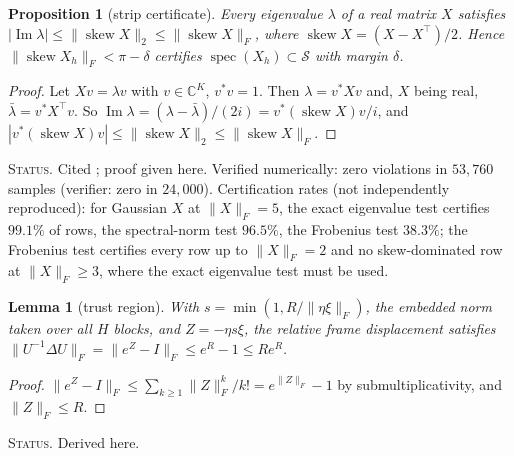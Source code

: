 \documentclass[11pt]{article}
\newtheorem{proposition}[theorem]{Proposition}
\newtheorem{lemma}[theorem]{Lemma}
\theoremstyle{definition}
\theoremstyle{remark}
\newcommand{\C}{\mathbb{C}}
\newcommand{\Imag}{\operatorname{Im}}
\newcommand{\spec}{\operatorname{spec}}
\newcommand{\status}[1]{\par\smallskip\noindent\textsc{Status.} #1\par\smallskip}
\begin{document}
\begin{proposition}[strip certificate]\label{prop:bendixson}
Every eigenvalue $\lambda$ of a real matrix $X$ satisfies $|\Imag \lambda|\le\|\operatorname{skew}X\|_2\le\|\operatorname{skew}X\|_F$, where $\operatorname{skew}X=(X-X^\top)/2$. Hence $\|\operatorname{skew}X_h\|_F<\pi-\delta$ certifies $\spec(X_h)\subset\mathcal{S}$ with margin $\delta$.
\end{proposition}
\begin{proof}
Let $Xv=\lambda v$ with $v\in\C^K$, $v^*v=1$. Then $\lambda=v^*Xv$ and, $X$ being real, $\bar\lambda=v^*X^\top v$. So $\Imag \lambda=(\lambda-\bar\lambda)/(2i)=v^*(\operatorname{skew}X)v/i$, and $|v^*(\operatorname{skew}X)v|\le\|\operatorname{skew}X\|_2\le\|\operatorname{skew}X\|_F$.
\end{proof}
\status{Cited \cite{Bendixson1902}; proof given here. Verified numerically: zero violations in $53{,}760$ samples (verifier: zero in $24{,}000$). Certification rates (not independently reproduced): for Gaussian $X$ at $\|X\|_F=5$, the exact eigenvalue test certifies $99.1\%$ of rows, the spectral-norm test $96.5\%$, the Frobenius test $38.3\%$; the Frobenius test certifies every row up to $\|X\|_F=2$ and no skew-dominated row at $\|X\|_F\ge3$, where the exact eigenvalue test must be used.}

\begin{lemma}[trust region]\label{lem:trust}
With $s=\min(1,R/\|\eta\xi\|_F)$, the embedded norm taken over all $H$ blocks, and $Z=-\eta s\xi$, the relative frame displacement satisfies $\|U^{-1}\Delta U\|_F=\|e^Z-I\|_F\le e^{R}-1\le Re^R$.
\end{lemma}
\begin{proof}
$\|e^Z-I\|_F\le\sum_{k\ge1}\|Z\|_F^k/k!=e^{\|Z\|_F}-1$ by submultiplicativity, and $\|Z\|_F\le R$.
\end{proof}
\status{Derived here.}
\end{document}
